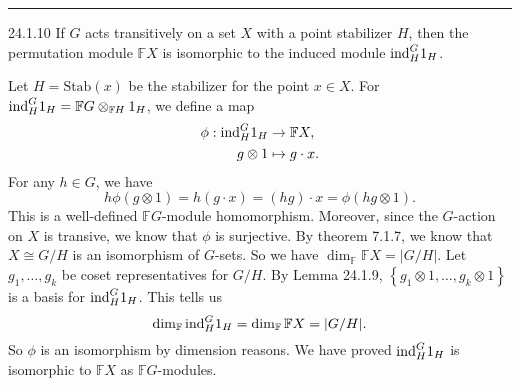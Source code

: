 \documentclass[a4paper, 12pt]{article}
\begin{document}
\noindent\rule{7in}{2.8pt}
\begin{problem}{24.1.10}
If \(G\) acts transitively on a set \(X\) with a point stabilizer \(H\), then the permutation module \(\mathbb{F}X\) is isomorphic to the induced module \(\text{ind}^G_H 1_H\).
\end{problem}
\begin{solution}
Let \(H=\text{Stab}(x)\) be the stabilizer for the point \(x\in X\). For \(\text{ind}^G_H1_H=\mathbb{F}G\otimes_{\mathbb{F}H}1_H\), we define a map 
\begin{align*}
	\phi:\text{ind}^G_H1_H&\rightarrow \mathbb{F}X,\\ 
	     g\otimes 1&\mapsto g\cdot x.
\end{align*}
For any \(h\in G\), we have 
\[h\phi(g\otimes 1)=h(g\cdot x)=(hg)\cdot x=\phi(hg\otimes 1).\]
This is a well-defined \(\mathbb{F}G\)-module homomorphism. Moreover, since the \(G\)-action on \(X\) is transive, we know that \(\phi\) is surjective. By theorem 7.1.7, we know that \(X\cong G/H\) is an isomorphism of \(G\)-sets. So we have \(\dim_\mathbb{F}\mathbb{F}X=|G/H|\). Let \(g_1,\ldots,g_k\) be coset 
representatives for \(G/H\). By Lemma 24.1.9, \(\left\{ g_1\otimes 1,\ldots,g_k\otimes 1 \right\}\) is a basis for \(\text{ind}^G_H1_H\). This tells us 
\[\dim_\mathbb{F}\text{ind}^G_H1_H=\dim_\mathbb{F}\mathbb{F}X=|G/H|.\]
So \(\phi\) is an isomorphism by dimension reasons. We have proved \(\text{ind}^G_H1_H\) is isomorphic to \(\mathbb{F}X\) as \(\mathbb{F}G\)-modules.
\end{solution}
\end{document}
